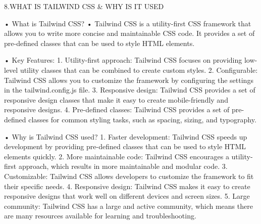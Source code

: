 8.WHAT IS TAILWIND CSS & WHY IS IT USED

•	What is Tailwind CSS?
•	Tailwind CSS is a utility-first CSS framework that allows you to write more concise and maintainable CSS code. It provides a set of pre-defined classes that can be used to style HTML elements.

•	Key Features:
1.	Utility-first approach: Tailwind CSS focuses on providing low-level utility classes that can be combined to create custom styles.
2.	Configurable: Tailwind CSS allows you to customize the framework by configuring the settings in the tailwind.config.js file.
3.	Responsive design: Tailwind CSS provides a set of responsive design classes that make it easy to create mobile-friendly and responsive designs.
4.	Pre-defined classes: Tailwind CSS provides a set of pre-defined classes for common styling tasks, such as spacing, sizing, and typography.

•	Why is Tailwind CSS used?
1.	Faster development: Tailwind CSS speeds up development by providing pre-defined classes that can be used to style HTML elements quickly.
2.	More maintainable code: Tailwind CSS encourages a utility-first approach, which results in more maintainable and modular code.
3.	Customizable: Tailwind CSS allows developers to customize the framework to fit their specific needs.
4.	Responsive design: Tailwind CSS makes it easy to create responsive designs that work well on different devices and screen sizes.
5.	Large community: Tailwind CSS has a large and active community, which means there are many resources available for learning and troubleshooting.








  





